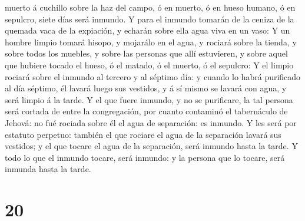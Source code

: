 muerto á cuchillo sobre la haz del campo, ó en muerto, ó en hueso
humano, ó en sepulcro, siete días será inmundo.  Y para
el inmundo tomarán de la ceniza de la quemada vaca de la expiación, y
echarán sobre ella agua viva en un vaso:  Y un hombre
limpio tomará hisopo, y mojarálo en el agua, y rociará sobre la tienda,
y sobre todos los muebles, y sobre las personas que allí estuvieren, y
sobre aquel que hubiere tocado el hueso, ó el matado, ó el muerto, ó el
sepulcro:  Y el limpio rociará sobre el inmundo al
tercero y al séptimo día: y cuando lo habrá purificado al día séptimo,
él lavará luego sus vestidos, y á sí mismo se lavará con agua, y será
limpio á la tarde.  Y el que fuere inmundo, y no se
purificare, la tal persona será cortada de entre la congregación, por
cuanto contaminó el tabernáculo de Jehová: no fué rociada sobre él el
agua de separación: es inmundo.  Y les será por estatuto
perpetuo: también el que rociare el agua de la separación lavará sus
vestidos; y el que tocare el agua de la separación, será inmundo hasta
la tarde.  Y todo lo que el inmundo tocare, será inmundo:
y la persona que lo tocare, será inmunda hasta la tarde.

\hypertarget{section-19}{%
\section{20}\label{section-19}}

